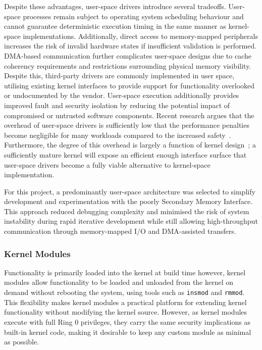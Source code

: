 \documentclass[final]{cmpreport}
\begin{document}
Despite these advantages, user-space drivers introduce several tradeoffs. User-space processes remain subject to operating system scheduling behaviour and cannot guarantee deterministic execution timing in the same manner as kernel-space implementations. Additionally, direct access to memory-mapped peripherals increases the risk of invalid hardware states if insufficient validation is performed. DMA-based communication further complicates user-space designs due to cache coherency requirements and restrictions surrounding physical memory visibility. Despite this, third-party drivers are commonly implemented in user space, utilising existing kernel interfaces to provide support for functionality overlooked or undocumented by the vendor. User-space execution additionally provides improved fault and security isolation by reducing the potential impact of compromised or untrusted software components. Recent research argues that the overhead of user-space drivers is sufficiently low that the performance penalties become negligible for many workloads compared to the increased safety~\cite{metzgerDeprivilegingLowLevelGPU2025}. Furthermore, the degree of this overhead is largely a function of kernel design~\cite{PerformanceUKernelBasedSystems}; a sufficiently mature kernel will expose an efficient enough interface surface that user-space drivers become a fully viable alternative to kernel-space implementation.

For this project, a predominantly user-space architecture was selected to simplify development and experimentation with the poorly Secondary Memory Interface. This approach reduced debugging complexity and minimised the risk of system instability during rapid iterative development while still allowing high-throughput communication through memory-mapped I/O and DMA-assisted transfers.

\subsubsection{Kernel Modules}
Functionality is primarily loaded into the kernel at build time however, kernel modules allow functionality to be loaded and unloaded from the kernel on demand without rebooting the system, using tools such as \texttt{insmod} and \texttt{rmmod}. This flexibility makes kernel modules a practical platform for extending kernel functionality without modifying the kernel source. However, as kernel modules execute with full Ring 0 privileges, they carry the same security implications as built-in kernel code, making it desirable to keep any custom module as minimal as possible.
\end{document}
